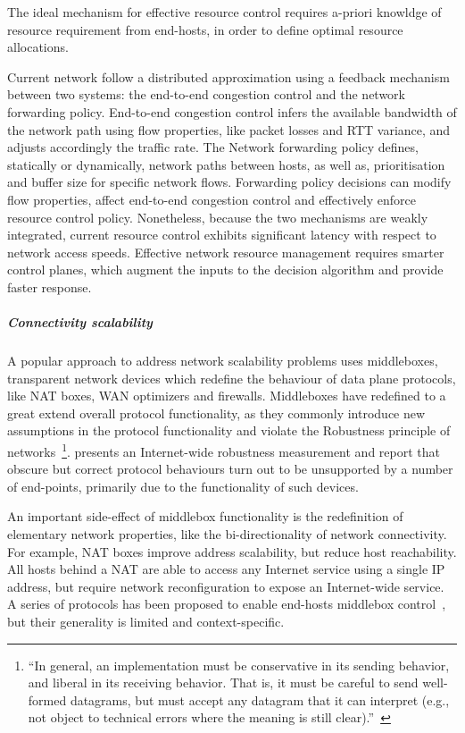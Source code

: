 The ideal mechanism for effective resource control requires a-priori knowldge of
resource requirement from end-hosts, in order to define optimal resource
allocations.

Current network follow a distributed approximation using a feedback mechanism between two
systems: the end-to-end congestion control and the network forwarding policy.
End-to-end congestion control infers the available bandwidth of the network path
using flow properties, like packet losses and RTT variance, and adjusts
accordingly the traffic rate. The Network forwarding policy defines, statically
or dynamically, network paths between hosts, as well as, prioritisation and
buffer size for specific network flows. Forwarding policy decisions can modify
flow properties, affect end-to-end congestion control and effectively enforce
resource control policy.  Nonetheless, because the two mechanisms are weakly
integrated, current resource control exhibits significant latency with respect
to network access speeds.  Effective network resource management requires
smarter control planes, which augment the inputs to the decision algorithm and
provide faster response.

\subparagraph*{Connectivity scalability} 

A popular approach to address network scalability problems uses middleboxes,
transparent network devices which redefine the behaviour of data plane
protocols, like NAT boxes, WAN optimizers and firewalls.  Middleboxes have
redefined to a great extend overall protocol functionality, as they commonly
introduce new assumptions in the protocol functionality and violate the
Robustness principle of networks~\footnote{``In general, an implementation must
  be conservative in its sending behavior, and liberal in its receiving
  behavior.  That is, it must be careful to send well-formed datagrams, but must
  accept any datagram that it can interpret (e.g., not object to technical
  errors where the meaning is still clear).''~\cite{RFC0791}}.
\cite{Honda:2011ci} presents an Internet-wide robustness measurement and report
that obscure but correct protocol behaviours turn out to be unsupported by a
number of end-points, primarily due to the functionality of such devices. 

An important side-effect of middlebox functionality is the redefinition of
elementary network properties, like the bi-directionality of network
connectivity.  For example, NAT boxes improve address scalability, but reduce
host reachability.  All hosts behind a NAT are able to access any Internet
service using a single IP address, but require network reconfiguration to expose
an Internet-wide service. A series of protocols has been proposed to 
enable end-hosts middlebox control~\cite{eggert08}, but their generality is
limited and context-specific.


